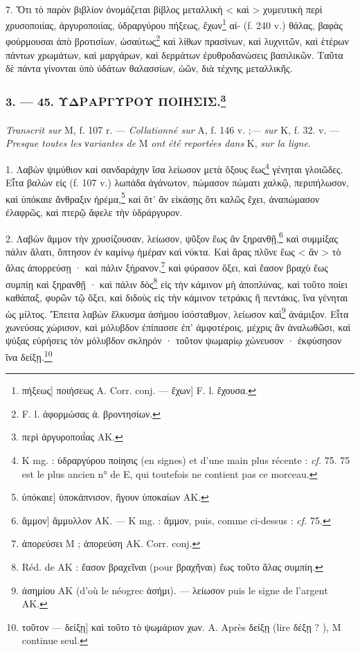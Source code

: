 \documentclass[landscape, a4paper, 11pt, oneside, polutonikogreek, french]{article}
\begin{document}
\paragraph{}
7. Ὅτι τὸ παρὸν βιβλίον ὀνομάζεται βίβλος μεταλλικὴ < καὶ > χυμευτικὴ περὶ χρυσοποιίας, ἀργυροποιίας, ὑδραργύρου πήξεως, ἔχων\footnote{πήξεως] ποιήσεως A. Corr. conj. --- ἔχων] F. l. ἔχουσα.} αἰ- (f. 240 v.) θάλας, βαφὰς φούρμουσαι ἀπὸ βροτισίων, ὡσαύτως\footnote{F. l. ἀφορμώσας ἀ. βροντησίων.} καὶ λίθων πρασίνων, καὶ λυχνιτῶν, καὶ ἑτέρων πάντων χρωμάτων, καὶ μαργάρων, καὶ δερμάτων ἐρυθροδανώσεις βασιλικῶν. Ταῦτα δὲ πάντα γίνονται ὑπὸ ὑδάτων θαλασσίων, ὠῶν, διὰ τέχνης μεταλλικῆς.

\bigskip
\centerline{\EightStarTaper}
\centerline{\EightStarTaper\EightStarTaper}
\bigskip

\subsubsection[3. --- 45. ΥΔΡΑΡΓΥΡΟΥ ΠΟΙΗΣΙΣ.]{3. --- 45. ΥΔΡΑΡΓΥΡΟΥ ΠΟΙΗΣΙΣ.\footnote{περὶ ἀργυροποιΐας AK.}}
\paragraph{}
\emph{Transcrit sur} M, f. 107 r. --- \emph{Collationné sur} A, f. 146 v. ;--- \emph{sur} K, f. 32. v. --- \emph{Presque toutes les νariantes de} M \emph{ont été reportées dans} K, \emph{sur la ligne}.

\bigskip

1. Λαβὼν ψιμύθιον καὶ σανδαράχην ἴσα λείωσον μετὰ ὄξους ἕως\footnote{K mg. : ὑδραργύρου ποίησις (en signes) et d'une main plus récente : \emph{cf.} 75. 75 est le plus ancien n° de E, qui toutefois ne contient pas ce morceau.} γένηται γλοιῶδες. Εἶτα βαλὼν εἰς (f. 107 v.) λωπάδα ἀγάνωτον, πώμασον πώματι χαλκῷ, περιπήλωσον, καὶ ὑπόκαιε ἄνθραξιν ἠρέμα,\footnote{ὑπόκαιε] ὑποκάπνισον, ἤγουν ὑποκαίων AK.} καὶ ὅτ' ἂν εἰκάσῃς ὅτι καλῶς ἔχει, ἀναπώμασον ἐλαφρῶς, καὶ πτερῷ ἄφελε τὴν ὑδράργυρον.

2. Λαβὼν ἄμμον τὴν χρυσίζουσαν, λείωσον, ψῦξον ἕως ἂν ξηρανθῇ,\footnote{ἄμμον] ἄμμυλλον AK. --- K mg. : ἄμμον, puis, comme ci-dessus : \emph{cf.} 75.} καὶ συμμίξας πάλιν ἅλατι, ὄπτησον ἐν καμίνῳ ἡμέραν καὶ νύκτα. Καὶ ἄρας πλῦνε ἕως < ἂν > τὸ ἄλας ἀπορρεύσῃ · καὶ πάλιν ξήρανον,\footnote{ἀπορεύσει M ; ἀπορεύση AK. Corr. conj.} καὶ φύρασον ὄξει, καὶ ἔασον βραχὺ ἕως συμπίῃ καὶ ξηρανθῇ · καὶ πάλιν δὸς\footnote{Réd. de AK : ἔασον βραχεῖναι (pour βραχῆναι) ἕως τοῦτο ἅλας συμπίη.} εἰς τὴν κάμινον μὴ ἀποπλύνας, καὶ τοῦτο ποίει καθάπαξ, φυρῶν τῷ ὄξει, καὶ διδοὺς εἰς τὴν κάμινον τετράκις ἢ πεντάκις, ἵνα γένηται ὡς μίλτος. Ἔπειτα λαβὼν ἕλκυσμα ἀσήμου ἰσόσταθμον, λείωσον καὶ\footnote{ἀσημίου AK (d'où le néogrec ἀσήμι). --- λείωσον puis le signe de l'argent AK.} ἀνάμιξον. Εἶτα χωνεύσας χώρισον, καὶ μόλυβδον ἐπίπασσε ἐπ' ἀμφοτέροις, μέχρις ἂν ἀναλωθῶσι, καὶ ψύξας εὑρήσεις τὸν μόλυβδον σκληρόν · τοῦτον ψωμαρίῳ χώνευσον · ἐκφύσησον ἵνα δείξῃ.\footnote{τοῦτον --- δείξῃ] καὶ τοῦτο τὸ ψωμάριον χων. A. Après δείξῃ (lire δέξῃ ? ), M continue seul.}
\end{document}
